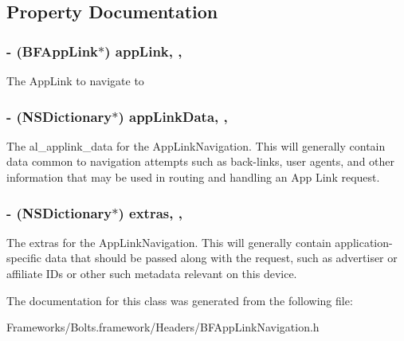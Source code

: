 \subsection{Property Documentation}
\hypertarget{interface_b_f_app_link_navigation_a052e0aa4d7101904ca825a21712cdd7b}{}
\subsubsection[{app\+Link}]{\setlength{\rightskip}{0pt plus 5cm}-\/ ({\bf B\+F\+App\+Link}$\ast$) app\+Link\hspace{0.3cm}{\ttfamily [read]}, {\ttfamily [nonatomic]}, {\ttfamily [strong]}}\label{interface_b_f_app_link_navigation_a052e0aa4d7101904ca825a21712cdd7b}
The App\+Link to navigate to \hypertarget{interface_b_f_app_link_navigation_a2412a1d4fa49c52d7883bee810e5026d}{}
\subsubsection[{app\+Link\+Data}]{\setlength{\rightskip}{0pt plus 5cm}-\/ (N\+S\+Dictionary$\ast$) app\+Link\+Data\hspace{0.3cm}{\ttfamily [read]}, {\ttfamily [nonatomic]}, {\ttfamily [copy]}}\label{interface_b_f_app_link_navigation_a2412a1d4fa49c52d7883bee810e5026d}
The al\+\_\+applink\+\_\+data for the App\+Link\+Navigation. This will generally contain data common to navigation attempts such as back-\/links, user agents, and other information that may be used in routing and handling an App Link request. \hypertarget{interface_b_f_app_link_navigation_a75478e20d3d2f13c93e8d0cd79b20b2c}{}
\subsubsection[{extras}]{\setlength{\rightskip}{0pt plus 5cm}-\/ (N\+S\+Dictionary$\ast$) extras\hspace{0.3cm}{\ttfamily [read]}, {\ttfamily [nonatomic]}, {\ttfamily [copy]}}\label{interface_b_f_app_link_navigation_a75478e20d3d2f13c93e8d0cd79b20b2c}
The extras for the App\+Link\+Navigation. This will generally contain application-\/specific data that should be passed along with the request, such as advertiser or affiliate I\+Ds or other such metadata relevant on this device. 

The documentation for this class was generated from the following file\+:\begin{DoxyCompactItemize}
\item 
Frameworks/\+Bolts.\+framework/\+Headers/B\+F\+App\+Link\+Navigation.\+h\end{DoxyCompactItemize}
